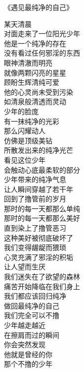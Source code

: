 \begin{center}
    《遇见最纯净的自己》\it
    \begin{multicols}{2}
        某天清晨 \\ 对面走来了一位阳光少年 \\ 他是一个纯净的存在 \\ 没有看过任何邪淫的东西 \\ 眼神清澈而明亮 \\ 就像两颗闪亮的星星 \\ 顾盼生辉清纯可爱 \\ 他的心灵尚未受到污染 \\ 如清泉般清透而灵动 \\ 少年的脸庞 \\ 有一抹纯净的光彩 \\ 那么闪耀动人 \\ 仿佛是顶级美钻 \\ 所散发出来的纯净光芒 \\ 看见这位少年 \\ 会触动心底最柔软的部分 \\ 少年带来的纯净气息 \\ 让人瞬间穿越了若干年 \\ 回到了撸管前的岁月 \\ 那时的每一天都那么单纯 \\ 那时的每一天都那么美好 \\ 直到染上了撸管恶习 \\ 这种美好被彻底破坏了 \\ 我们变得龌龊而猥琐 \\ 心灵充满了邪淫的积垢 \\ 让人望而生厌 \\ 我们迷失在了欲望的森林 \\ 痛苦开始降临在我们身上 \\ 我们都应该回归纯净 \\ 做回最纯净的自己 \\ 我们完全可以不撸 \\ 少年越走越近 \\ 在擦肩而过的瞬间 \\ 你会突然发现 \\ 他就是曾经的你 \\ 那个不撸的少年
    \end{multicols}
\end{center}

